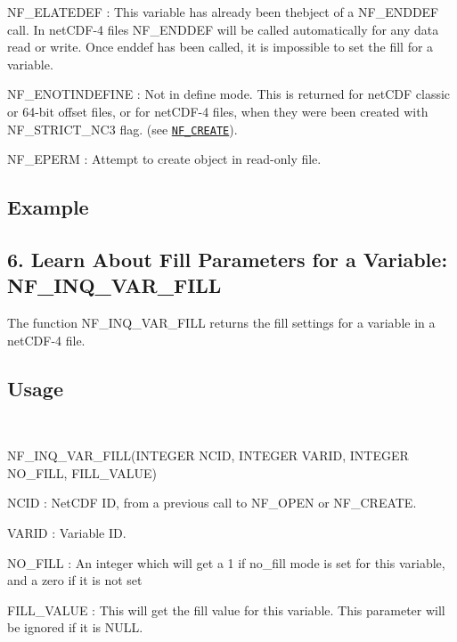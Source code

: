 {\ttfamily N\+F\+\_\+\+E\+L\+A\+T\+E\+D\+EF} \+: This variable has already been thebject of a N\+F\+\_\+\+E\+N\+D\+D\+EF call. In net\+C\+D\+F-\/4 files N\+F\+\_\+\+E\+N\+D\+D\+EF will be called automatically for any data read or write. Once enddef has been called, it is impossible to set the fill for a variable.

{\ttfamily N\+F\+\_\+\+E\+N\+O\+T\+I\+N\+D\+E\+F\+I\+NE} \+: Not in define mode. This is returned for net\+C\+DF classic or 64-\/bit offset files, or for net\+C\+D\+F-\/4 files, when they were been created with N\+F\+\_\+\+S\+T\+R\+I\+C\+T\+\_\+\+N\+C3 flag. (see \href{#NF_005fCREATE}{\tt N\+F\+\_\+\+C\+R\+E\+A\+TE}).

{\ttfamily N\+F\+\_\+\+E\+P\+E\+RM} \+: Attempt to create object in read-\/only file.

\subsection*{Example }

\subsection*{6. Learn About Fill Parameters for a Variable\+: {\ttfamily N\+F\+\_\+\+I\+N\+Q\+\_\+\+V\+A\+R\+\_\+\+F\+I\+LL} }

The function N\+F\+\_\+\+I\+N\+Q\+\_\+\+V\+A\+R\+\_\+\+F\+I\+LL returns the fill settings for a variable in a net\+C\+D\+F-\/4 file.

\subsection*{Usage }

 

N\+F\+\_\+\+I\+N\+Q\+\_\+\+V\+A\+R\+\_\+\+F\+I\+L\+L(\+I\+N\+T\+E\+G\+E\+R N\+C\+I\+D, I\+N\+T\+E\+G\+E\+R V\+A\+R\+I\+D, I\+N\+T\+E\+G\+E\+R N\+O\+\_\+\+F\+I\+L\+L, F\+I\+L\+L\+\_\+\+V\+A\+L\+U\+E)

{\ttfamily N\+C\+ID} \+: Net\+C\+DF ID, from a previous call to N\+F\+\_\+\+O\+P\+EN or N\+F\+\_\+\+C\+R\+E\+A\+TE.

{\ttfamily V\+A\+R\+ID} \+: Variable ID.

{\ttfamily N\+O\+\_\+\+F\+I\+LL} \+: An integer which will get a 1 if no\+\_\+fill mode is set for this variable, and a zero if it is not set

{\ttfamily F\+I\+L\+L\+\_\+\+V\+A\+L\+UE} \+: This will get the fill value for this variable. This parameter will be ignored if it is N\+U\+LL.

